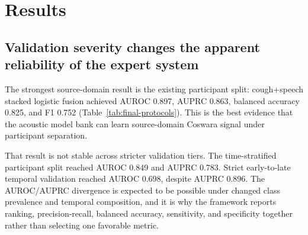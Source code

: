 \documentclass[preprint,12pt]{elsarticle}
\begin{document}
\section{Results}

\subsection{Validation severity changes the apparent reliability of the expert system}

The strongest source-domain result is the existing participant split: cough+speech stacked logistic fusion achieved AUROC 0.897, AUPRC 0.863, balanced accuracy 0.825, and F1 0.752 (Table~\ref{tab:final-protocols}). This is the best evidence that the acoustic model bank can learn source-domain Coswara signal under participant separation.

That result is not stable across stricter validation tiers. The time-stratified participant split reached AUROC 0.849 and AUPRC 0.783. Strict early-to-late temporal validation reached AUROC 0.698, despite AUPRC 0.896. The AUROC/AUPRC divergence is expected to be possible under changed class prevalence and temporal composition, and it is why the framework reports ranking, precision-recall, balanced accuracy, sensitivity, and specificity together rather than selecting one favorable metric.

\begin{table}[t]
\centering
\caption{Final selected ComParE2016+IS10 validation results across protocol tiers. The modality column defines the evidence scope: Coswara rows support source-domain and temporal analysis, while the COUGHVID row is cough-only external transfer.}
\label{tab:final-protocols}
\scriptsize
\setlength{\tabcolsep}{2.5pt}
\end{table}
\end{document}
